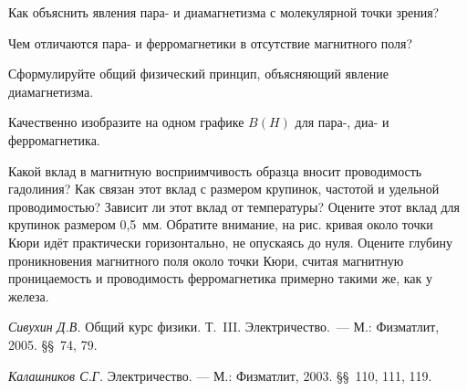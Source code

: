 \begin{lab:questions}

	\item Как объяснить явления пара- и диамагнетизма с молекулярной точки зрения?
	
	\item Чем отличаются пара- и ферромагнетики в отсутствие магнитного поля?
	
	\item Сформулируйте общий физический принцип, объясняющий явление диамагнетизма.
	
	\item Качественно изобразите на одном графике $B(H)$ для пара-, диа- и ферромагнетика.
	
	\item Какой вклад в магнитную восприимчивость образца вносит проводимость гадолиния? Как связан этот вклад с размером 
	крупинок, частотой и удельной проводимостью? Зависит ли этот вклад от температуры? Оцените этот вклад для крупинок
	размером 0,5~мм. Обратите внимание, на рис.  кривая около точки Кюри идёт практически горизонтально, не опускаясь до нуля. Оцените  глубину проникновения магнитного поля около точки Кюри, считая магнитную проницаемость и проводимость ферромагнетика примерно такими же, как у железа.
\end{lab:questions}


\begin{lab:literature}
	\item \emph {Сивухин Д.В.} Общий курс физики. Т.~III. Электричество.~--- М.: Физматлит, 2005. \S\S~74, 79.
	
	\item \emph{Калашников С.Г.} Электричество. --- М.: Физматлит, 2003. \S\S~110, 111, 119.
\end{lab:literature}

